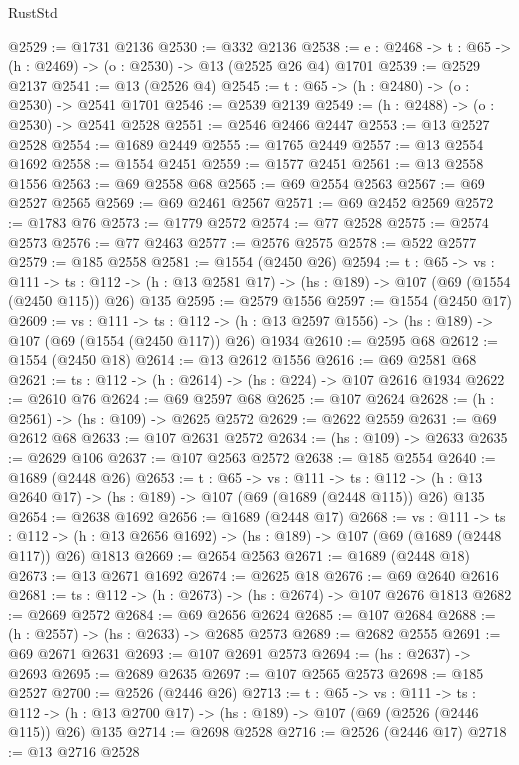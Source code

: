 \begin{lexlean}{RustStd}
\begin{coremodule}
@2529 := @1731 @2136
@2530 := @332 @2136
@2538 := {e : @2468} -> {t : @65} -> (h : @2469) -> (o : @2530) -> @13 (@2525 @26 @4) @1701
@2539 := @2529 @2137
@2541 := @13 (@2526 @4)
@2545 := {t : @65} -> (h : @2480) -> (o : @2530) -> @2541 @1701
@2546 := @2539 @2139
@2549 := (h : @2488) -> (o : @2530) -> @2541 @2528
@2551 := @2546 @2466 @2447
@2553 := @13 @2527 @2528
@2554 := @1689 @2449
@2555 := @1765 @2449
@2557 := @13 @2554 @1692
@2558 := @1554 @2451
@2559 := @1577 @2451
@2561 := @13 @2558 @1556
@2563 := @69 @2558 @68
@2565 := @69 @2554 @2563
@2567 := @69 @2527 @2565
@2569 := @69 @2461 @2567
@2571 := @69 @2452 @2569
@2572 := @1783 @76
@2573 := @1779 @2572
@2574 := @77 @2528
@2575 := @2574 @2573
@2576 := @77 @2463
@2577 := @2576 @2575
@2578 := @522 @2577
@2579 := @185 @2558
@2581 := @1554 (@2450 @26)
@2594 := {t : @65} ->
  {vs : @111} ->
  {ts : @112} -> (h : @13 @2581 @17) -> (hs : @189) -> @107 (@69 (@1554 (@2450 @115)) @26) @135
@2595 := @2579 @1556
@2597 := @1554 (@2450 @17)
@2609 := {vs : @111} ->
  {ts : @112} -> (h : @13 @2597 @1556) -> (hs : @189) -> @107 (@69 (@1554 (@2450 @117)) @26) @1934
@2610 := @2595 @68
@2612 := @1554 (@2450 @18)
@2614 := @13 @2612 @1556
@2616 := @69 @2581 @68
@2621 := {ts : @112} -> (h : @2614) -> (hs : @224) -> @107 @2616 @1934
@2622 := @2610 @76
@2624 := @69 @2597 @68
@2625 := @107 @2624
@2628 := (h : @2561) -> (hs : @109) -> @2625 @2572
@2629 := @2622 @2559
@2631 := @69 @2612 @68
@2633 := @107 @2631 @2572
@2634 := (hs : @109) -> @2633
@2635 := @2629 @106
@2637 := @107 @2563 @2572
@2638 := @185 @2554
@2640 := @1689 (@2448 @26)
@2653 := {t : @65} ->
  {vs : @111} ->
  {ts : @112} -> (h : @13 @2640 @17) -> (hs : @189) -> @107 (@69 (@1689 (@2448 @115)) @26) @135
@2654 := @2638 @1692
@2656 := @1689 (@2448 @17)
@2668 := {vs : @111} ->
  {ts : @112} -> (h : @13 @2656 @1692) -> (hs : @189) -> @107 (@69 (@1689 (@2448 @117)) @26) @1813
@2669 := @2654 @2563
@2671 := @1689 (@2448 @18)
@2673 := @13 @2671 @1692
@2674 := @2625 @18
@2676 := @69 @2640 @2616
@2681 := {ts : @112} -> (h : @2673) -> (hs : @2674) -> @107 @2676 @1813
@2682 := @2669 @2572
@2684 := @69 @2656 @2624
@2685 := @107 @2684
@2688 := (h : @2557) -> (hs : @2633) -> @2685 @2573
@2689 := @2682 @2555
@2691 := @69 @2671 @2631
@2693 := @107 @2691 @2573
@2694 := (hs : @2637) -> @2693
@2695 := @2689 @2635
@2697 := @107 @2565 @2573
@2698 := @185 @2527
@2700 := @2526 (@2446 @26)
@2713 := {t : @65} ->
  {vs : @111} ->
  {ts : @112} -> (h : @13 @2700 @17) -> (hs : @189) -> @107 (@69 (@2526 (@2446 @115)) @26) @135
@2714 := @2698 @2528
@2716 := @2526 (@2446 @17)
@2718 := @13 @2716 @2528

\end{coremodule}
\end{lexlean}
